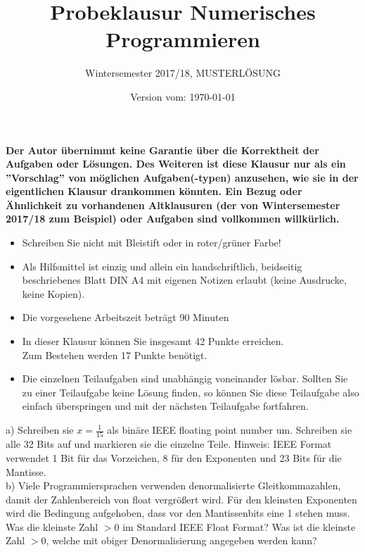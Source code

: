 \documentclass{scrartcl}
\begin{document}
	
	\title{Probeklausur Numerisches Programmieren}
	\subtitle{Wintersemester 2017/18, MUSTERLÖSUNG}
	\author{\npauthor{}}
	\date{Version vom: \today}
	\maketitle
	
	\textbf{Der Autor übernimmt keine Garantie über die Korrektheit der Aufgaben oder Lösungen. \n Des Weiteren ist diese Klausur nur als ein ''Vorschlag'' von möglichen Aufgaben(-typen) anzusehen, wie sie in der eigentlichen Klausur drankommen könnten. Ein Bezug oder Ähnlichkeit zu vorhandenen Altklausuren (der von Wintersemester 2017/18 zum Beispiel) oder Aufgaben sind vollkommen willkürlich.}
	\sbreak
	
	\begin{itemize}
		\item Schreiben Sie nicht mit Bleistift oder in roter/grüner Farbe!
		\item Als Hilfsmittel ist einzig und allein ein handschriftlich, beidseitig beschriebenes Blatt DIN A4 mit eigenen Notizen erlaubt (keine Ausdrucke, keine Kopien).
		\item Die vorgesehene Arbeitszeit beträgt 90 Minuten
		\item In dieser Klausur können Sie insgesamt 42 Punkte erreichen. \\Zum Bestehen werden 17 Punkte benötigt.
		\item Die einzelnen Teilaufgaben sind unabhängig voneinander lösbar.
		Sollten Sie zu einer Teilaufgabe keine Lösung finden, so können Sie diese Teilaufgabe also einfach überspringen und mit der nächsten Teilaufgabe fortfahren.
	\end{itemize}
	
	
	a) 
	Schreiben sie $x = \frac{1}{15}$ als binäre IEEE floating point number um. Schreiben sie alle 32 Bits auf und markieren sie die einzelne Teile.
	\n
	Hinweis: IEEE Format verwendet 1 Bit für das Vorzeichen, 8 für den Exponenten und 23 Bits für die Mantisse. 
	\lbreak
	\\
	b) 
	Viele Programmiersprachen verwenden denormalisierte Gleitkommazahlen, damit der Zahlenbereich von float vergrößert wird. Für den kleinsten Exponenten wird die Bedingung aufgehoben, dass vor den Mantissenbits eine 1 stehen muss.
	\n 
	Was die kleinste Zahl $>0$ im Standard IEEE Float Format?
	\n 
	Was ist die kleinste Zahl $>0$, welche mit obiger Denormalisierung angegeben werden kann?
	
\end{document}
